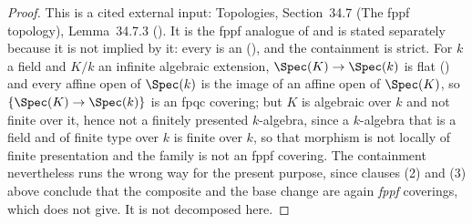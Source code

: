 \begin{proof}
This is a cited external input: Topologies, Section~34.7 (The fppf topology),
Lemma~34.7.3 ().  It is the fppf analogue of
 and is stated separately because it is
not implied by it: every  is an
 (),
and the containment is strict.  For $k$ a field and $K/k$ an infinite algebraic
extension, $\Spec(K)\to\Spec(k)$ is flat () and every
affine open of $\Spec(k)$ is the image of an affine open of $\Spec(K)$, so
$\{\Spec(K)\to\Spec(k)\}$ is an fpqc covering; but $K$ is algebraic over $k$
and not finite over it, hence not a finitely presented $k$-algebra, since a
$k$-algebra that is a field and of finite type over $k$ is finite over $k$, so
that morphism is not locally of finite presentation and the family is not an
fppf covering.  The containment nevertheless runs the wrong way for the present
purpose, since clauses (2) and (3) above conclude that the composite and the
base change are again \emph{fppf} coverings, which
 does not give.  It is not decomposed here.
\end{proof}

